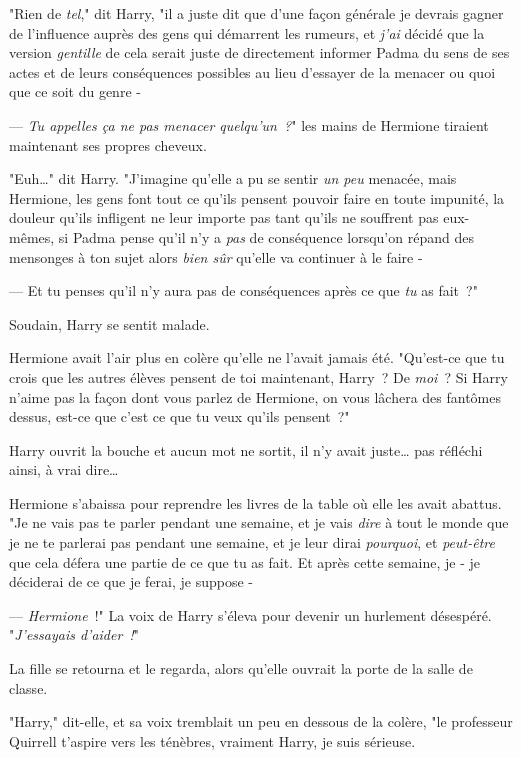 "Rien de \emph{tel}," dit Harry, "il a juste dit que d'une façon générale je devrais gagner de l'influence auprès des gens qui démarrent les rumeurs, et \emph{j'ai} décidé que la version \emph{gentille} de cela serait juste de directement informer Padma du sens de ses actes et de leurs conséquences possibles au lieu d'essayer de la menacer ou quoi que ce soit du genre -

--- \emph{Tu appelles ça ne pas menacer quelqu'un~?}" les mains de Hermione tiraient maintenant ses propres cheveux.

"Euh…" dit Harry. "J'imagine qu'elle a pu se sentir \emph{un peu} menacée, mais Hermione, les gens font tout ce qu'ils pensent pouvoir faire en toute impunité, la douleur qu'ils infligent ne leur importe pas tant qu'ils ne souffrent pas eux-mêmes, si Padma pense qu'il n'y a \emph{pas} de conséquence lorsqu'on répand des mensonges à ton sujet alors \emph{bien sûr} qu'elle va continuer à le faire -

--- Et tu penses qu'il n'y aura pas de conséquences après ce que \emph{tu} as fait~?"

Soudain, Harry se sentit malade.

Hermione avait l'air plus en colère qu'elle ne l'avait jamais été. "Qu'est-ce que tu crois que les autres élèves pensent de toi maintenant, Harry~? De \emph{moi}~? Si Harry n'aime pas la façon dont vous parlez de Hermione, on vous lâchera des fantômes dessus, est-ce que c'est ce que tu veux qu'ils pensent~?"

Harry ouvrit la bouche et aucun mot ne sortit, il n'y avait juste… pas réfléchi ainsi, à vrai dire…

Hermione s'abaissa pour reprendre les livres de la table où elle les avait abattus. "Je ne vais pas te parler pendant une semaine, et je vais \emph{dire} à tout le monde que je ne te parlerai pas pendant une semaine, et je leur dirai \emph{pourquoi}, et \emph{peut-être} que cela défera une partie de ce que tu as fait. Et après cette semaine, je - je déciderai de ce que je ferai, je suppose -

--- \emph{Hermione}~!" La voix de Harry s'éleva pour devenir un hurlement désespéré. "\emph{J'essayais d'aider~!}"

La fille se retourna et le regarda, alors qu'elle ouvrait la porte de la salle de classe.

"Harry," dit-elle, et sa voix tremblait un peu en dessous de la colère, "le professeur Quirrell t'aspire vers les ténèbres, vraiment Harry, je suis sérieuse.

